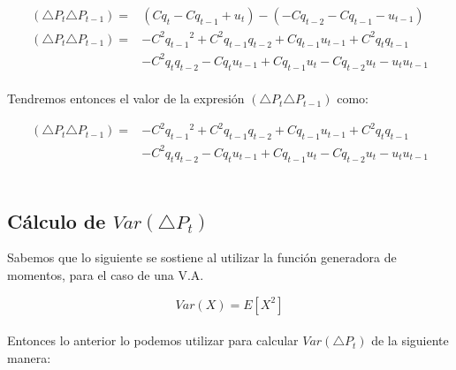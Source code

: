 \documentclass[a4paper]{article}
\begin{document}
\begin{equation*}
\begin{aligned}
	(\triangle{P}_{t}\triangle{P}_{t-1}) = & (C{q}_{t} - C{q}_{t-1} + {u}_{t}) - (- C{q}_{t-2} - C{q}_{t-1} - {u}_{t-1}) \\
    (\triangle{P}_{t}\triangle{P}_{t-1}) = &-{C}^{2}{{q}_{t-1}}^{2} + {C}^{2}{q}_{t-1}{q}_{t-2} + 
    C{q}_{t-1}{u}_{t-1} + {C}^{2}{q}_{t}{q}_{t-1} \\ 
    & - {C}^{2}{q}_{t}{q}_{t-2}  - C{q}_{t}{u}_{t-1} + C{q}_{t-1}{u}_{t} - 
    C{q}_{t-2}{u}_{t} - {u}_{t}{u}_{t-1}
\end{aligned}
\end{equation*}
\\

Tendremos entonces el valor de la expresi\'on $(\triangle{P}_{t}\triangle{P}_{t-1})$ como:

\begin{equation}
\begin{aligned}
	(\triangle{P}_{t}\triangle{P}_{t-1}) = &-{C}^{2}{{q}_{t-1}}^{2} + {C}^{2}{q}_{t-1}{q}_{t-2} + 
    C{q}_{t-1}{u}_{t-1} + {C}^{2}{q}_{t}{q}_{t-1} \\ 
    & - {C}^{2}{q}_{t}{q}_{t-2}  - C{q}_{t}{u}_{t-1} + C{q}_{t-1}{u}_{t} - 
    C{q}_{t-2}{u}_{t} - {u}_{t}{u}_{t-1}
\end{aligned}
\end{equation}
\\

\subsection*{C\'alculo de $Var(\triangle{P}_{t})$}

Sabemos que lo siguiente se sostiene al utilizar la funci\'on generadora de momentos, para el caso de una V.A.

\begin{equation}
Var(X) =  E \left[ {X}^{2} \right]
\end{equation}
\\

Entonces lo anterior lo podemos utilizar para calcular $Var(\triangle{P}_{t})$ de la siguiente manera: \\
\end{document}
